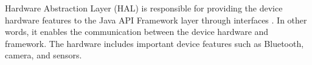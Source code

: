 Hardware Abstraction Layer (HAL) is responsible for providing the device hardware features to the Java API Framework layer through interfaces \cite{7}. In other words, it enables the communication between the device hardware and framework. The hardware includes important device features such as Bluetooth, camera, and sensors.